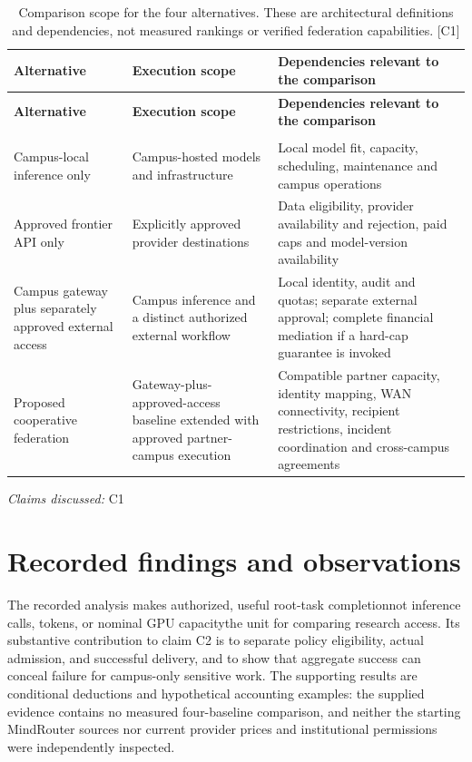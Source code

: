 \documentclass[11pt]{article}
\begin{document}
\begin{longtable}{@{}>{\raggedright\arraybackslash}p{}>{\raggedright\arraybackslash}p{}>{\raggedright\arraybackslash}p{}@{}}
\caption{Comparison scope for the four alternatives. These are architectural definitions and dependencies, not measured rankings or verified federation capabilities. [C1]}\\
\toprule
\textbf{Alternative} & \textbf{Execution scope} & \textbf{Dependencies relevant to the comparison}\\
\midrule
\endfirsthead
\toprule
\textbf{Alternative} & \textbf{Execution scope} & \textbf{Dependencies relevant to the comparison}\\
\midrule
\endhead
\midrule
\multicolumn{3}{r}{\footnotesize Continued on next page}\\
\endfoot
\bottomrule
\endlastfoot
Campus-local inference only & Campus-hosted models and infrastructure & Local model fit, capacity, scheduling, maintenance and campus operations\\
Approved frontier API only & Explicitly approved provider destinations & Data eligibility, provider availability and rejection, paid caps and model-version availability\\
Campus gateway plus separately approved external access & Campus inference and a distinct authorized external workflow & Local identity, audit and quotas; separate external approval; complete financial mediation if a hard-cap guarantee is invoked\\
Proposed cooperative federation & Gateway-plus-approved-access baseline extended with approved partner-campus execution & Compatible partner capacity, identity mapping, WAN connectivity, recipient restrictions, incident coordination and cross-campus agreements\\
\end{longtable}
\par{}
\textit{Claims discussed: }C1
\section{Recorded findings and observations}
The recorded analysis makes authorized, useful root-task completion\textemdash{}not inference calls, tokens, or nominal GPU capacity\textemdash{}the unit for comparing research access. Its substantive contribution to claim C2 is to separate policy eligibility, actual admission, and successful delivery, and to show that aggregate success can conceal failure for campus-only sensitive work. The supporting results are conditional deductions and hypothetical accounting examples: the supplied evidence contains no measured four-baseline comparison, and neither the starting MindRouter sources nor current provider prices and institutional permissions were independently inspected.
\end{document}
